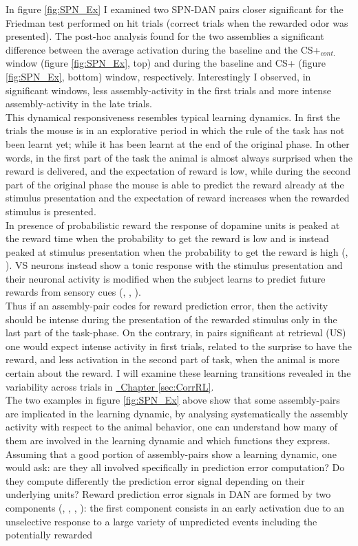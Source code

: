 In figure \ref{fig:SPN_Ex} I examined two SPN-DAN pairs closer significant for the Friedman test performed on hit trials (correct trials when the rewarded odor was presented). The post-hoc analysis found for the two assemblies a significant difference between the average activation during the baseline and the CS+$_{cont.}$ window (figure \ref{fig:SPN_Ex}, top) and during the baseline and CS+ (figure \ref{fig:SPN_Ex}, bottom) window, respectively. Interestingly I observed, in significant windows, less assembly-activity in the first trials and more intense assembly-activity in the late trials.\\This dynamical responsiveness resembles typical learning dynamics. In first the trials the mouse is in an explorative period in which the rule of the task has not been learnt yet; while it has been learnt at the end of the original phase. In other words, in the first part of the task the animal is almost always surprised when the reward is delivered, and the expectation of reward is low, while during the second part of the original phase the mouse is able to predict the reward already at the stimulus presentation and the expectation of reward increases when the rewarded stimulus is presented.\\In presence of probabilistic reward the response of dopamine units is peaked at the reward time when the probability to get the reward is low and is instead peaked at stimulus presentation when the probability to get the reward is high (\cite{Schultz1992}, \cite{Schultz} \cite{Fiorillo}). VS neurons instead show a tonic response with the stimulus presentation and their neuronal activity is modified when the subject learns to predict future rewards from sensory cues (\cite{Pagnoni}, \cite{Schultz2000}, \cite{Radua}).\\Thus if an assembly-pair codes for reward prediction error, then the activity should be intense during the presentation of the rewarded stimulus only in the last part of the task-phase. On the contrary, in pairs significant at retrieval (US) one would expect intense activity in first trials, related to the surprise to have the reward, and less activation in the second part of task, when the animal is more certain about the reward. I will examine these learning transitions revealed in the variability across trials in \hyperref[sec:CorrRL]{~Chapter \ref*{sec:CorrRL}}.\\The two examples in figure \ref{fig:SPN_Ex} above show that some assembly-pairs are implicated in the learning dynamic, by analysing systematically the assembly activity with respect to the animal behavior, one can understand how many of them are involved in the learning dynamic and which functions they express. Assuming that a good portion of assembly-pairs show a learning dynamic, one would ask: are they all involved specifically in prediction error computation? Do they compute differently the prediction error signal depending on their underlying units? Reward prediction error signals in DAN are formed by two components (\cite{Tobler2003}, \cite{Nomoto2010}, \cite{Fiorillo2013}, \cite{Schultz2016}): the first component consists in an early activation due to an unselective response to a large variety of unpredicted events including the potentially rewarded 
